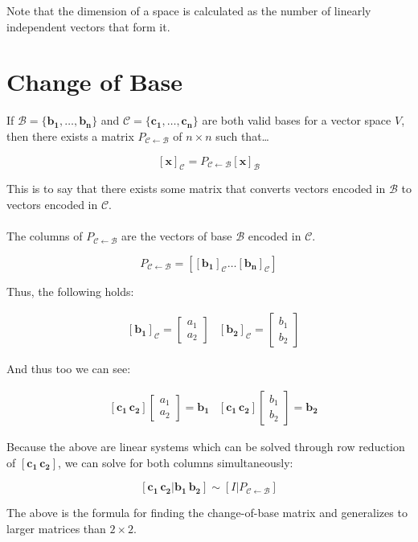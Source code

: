\documentclass[12pt]{article}
\newcommand{\bm}[1]{\mathbf{{#1}}}
\newcommand{\mb}{\begin{bmatrix}}
\newcommand{\me}{\end{bmatrix}}
\newcommand{\mmc}[1]{\mathcal{{#1}}}
\newcommand{\set}[1]{\{{#1}\}}
\begin{document}
Note that the dimension of a space is calculated as the number of linearly independent vectors that form it.

\section*{Change of Base}

If $\mmc{B} = \set{\bm{b_1},\dots,\bm{b_n}}$ and $\mmc{C} = \set{\bm{c_1,\dots,c_n}}$ are both valid
bases for a vector space $V$, then there exists a matrix $P_{\mmc{C} \leftarrow \mmc{B}}$ of $n \times n$ such that\dots

$$[\bm{x}]_\mmc{C} = P_{\mmc{C} \leftarrow \mmc{B}}[\bm{x}]_{\mmc{B}}$$

This is to say that there exists some matrix that converts vectors
encoded in $\mmc{B}$ to vectors encoded in $\mmc{C}$. \\ \\

The columns of $P_{\mmc{C} \leftarrow \mmc{B}}$ are the vectors of base $\mmc{B}$ encoded in $\mmc{C}$.

$$P_{\mmc{C} \leftarrow \mmc{B}} = [[\bm{b_1}]_\mmc{C} \dots [\bm{b_n}]_\mmc{C}]$$

Thus, the following holds:

\begin{align*}
    & [\bm{b_1}]_\mmc{C} = \mb a_1 \\ a_2 \me
    & [\bm{b_2}]_\mmc{C} = \mb b_1 \\ b_2 \me 
\end{align*}

And thus too we can see:

\begin{align*}
    & [\bm{c_1 \, c_2}] \mb a_1 \\ a_2 \me = \bm{b_1}
    & [\bm{c_1 \, c_2}] \mb b_1 \\ b_2 \me = \bm{b_2}
\end{align*}

Because the above are linear systems which can be solved through row reduction of
$[\bm{c_1 \, c_2}]$, we can solve for both columns simultaneously:

$$[\bm{c_1 \, c_2 | b_1 \, b_2}] \sim [I | P_{\mmc{C \leftarrow B}}]$$

The above is the formula for finding the change-of-base matrix and
generalizes to larger matrices than $2 \times 2$. \\ \\
\end{document}
